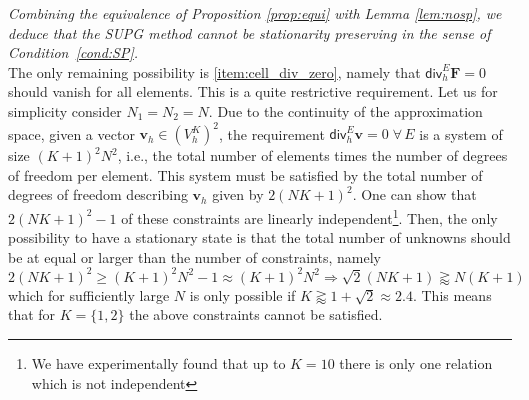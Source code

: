 \documentclass[a4paper,10pt]{article}
\begin{document}
\emph{Combining the equivalence  of Proposition \ref{prop:equi} with Lemma \ref{lem:nosp}, we deduce that the SUPG method cannot be stationarity preserving
in the sense of Condition~\ref{cond:SP}.}\\

The only remaining possibility is \ref{item:cell_div_zero}, namely that $\textsf{div}^E_h \mathbf{F} =0$ should vanish for all elements.
This is a quite restrictive requirement.  Let us  for simplicity  consider $N_1=N_2=N$. Due to  the continuity of the approximation space, 
given  a vector $\mathbf{v}_h\in (V_h^K)^2$, the requirement $\textsf{div}^E_h \mathbf{v}=0\;\forall \,E$ is a system of size $(K+1)^2 N^2$, i.e.,
the total number of elements times the number of  degrees of freedom per element.
This system must be satisfied by  the total number of degrees of freedom describing  $\mathbf{v}_h$ given by  $2 ( N K +1 )^2 $. One can show that  $2 ( N K +1 )^2-1 $ of these constraints are linearly independent\footnote{We have  experimentally found   that up to $K=10$  there is only one relation which is not independent}.
Then, the only possibility  to have a stationary state is that the total number of unknowns should be at equal or larger than the number of constraints, namely 
$$
2 ( N K +1 )^2 \ge (K+1)^2 N^2-1 \approx (K+1)^2 N^2 \Rightarrow \sqrt{2}( NK+1) \gtrapprox N(K+1)   
$$
which for  sufficiently large $N$ is only possible if $K \gtrapprox 1+\sqrt{2} \approx 2.4$.
This means that for  $K = \{ 1,2\} $ the above constraints cannot be satisfied. %
\end{document}

